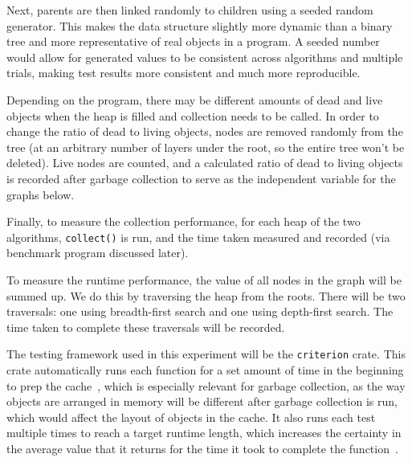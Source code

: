 \documentclass[index]{subfiles}
\begin{document}
Next, parents are then linked randomly to children using a seeded random generator. This makes the data structure slightly more dynamic than a binary tree and more representative of real objects in a program. A seeded number would allow for generated values to be consistent across algorithms and multiple trials, making test results more consistent and much more reproducible.

Depending on the program, there may be different amounts of dead and live objects when the heap is filled and collection needs to be called. In order to change the ratio of dead to living objects, nodes are removed randomly from the tree (at an arbitrary number of layers under the root, so the entire tree won't be deleted). Live nodes are counted, and a calculated ratio of dead to living objects is recorded after garbage collection to serve as the independent variable for the graphs below.

Finally, to measure the collection performance, for each heap of the two algorithms, \verb+collect()+ is run, and the time taken measured and recorded (via benchmark program discussed later).

To measure the runtime performance, the value of all nodes in the graph will be summed up. We do this by traversing the heap from the roots. There will be two traversals: one using breadth-first search and one using depth-first search. The time taken to complete these traversals will be recorded.

The testing framework used in this experiment will be the \verb+criterion+ crate. This crate automatically runs each function for a set amount of time in the beginning to prep the cache~\parencite{brookheislerAnalysisProcessCriterion}, which is especially relevant for garbage collection, as the way objects are arranged in memory will be different after garbage collection is run, which would affect the layout of objects in the cache. It also runs each test multiple times to reach a target runtime length, which increases the certainty in the average value that it returns for the time it took to complete the function~\parencite{brookheislerAnalysisProcessCriterion}.
\end{document}

